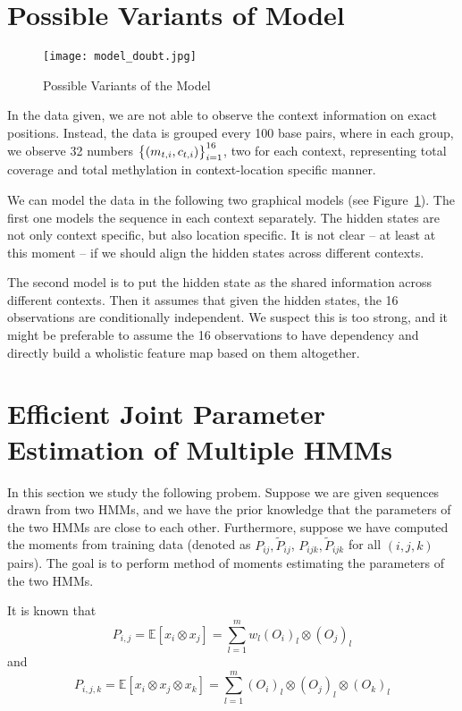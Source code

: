 \documentclass{article}
\def\E{\mathbb{E}}
\begin{document}
\section{Possible Variants of Model}

\begin{figure}
  \caption{Possible Variants of the Model}
  \centering
  \texttt{[image: model\_doubt.jpg]}
  \label{fig:modeldoubt}
\end{figure}

In the data given, we are not able to observe the context information on exact positions.
Instead, the data is grouped every 100 base pairs, where in each group, we observe
32 numbers $\cbr{(m_{t,i}, c_{t,i})}_{i=1}^{16}$, two for each context, representing
total coverage and total methylation in context-location specific manner.

We can model the data in the following two graphical models (see Figure~\ref{fig:modeldoubt}). The first one models
the sequence in each context separately. The hidden states are not only context specific,
but also location specific. It is not clear -- at least at this moment -- if we should
align the hidden states across different contexts.

The second model is to put the hidden state as the shared information across different
contexts. Then it assumes that given the hidden states, the 16 observations are conditionally
independent. We suspect this is too strong, and it might be preferable to assume the
16 observations to have dependency and directly build a wholistic feature map based
on them altogether.

\section{Efficient Joint Parameter Estimation of Multiple HMMs}
In this section we study the following probem.
Suppose we are given sequences drawn from two HMMs, and we have the prior knowledge that
the parameters of the two HMMs are close to each other.
Furthermore, suppose we have computed the moments from training data
(denoted as $P_{ij}, \tilde P_{ij}$, $P_{ijk}, \tilde P_{ijk}$ for all $(i,j,k)$ pairs).
The goal is to perform method of moments estimating the parameters of the two HMMs.

It is known that
\[ P_{i,j} = \E[x_i \otimes x_j] = \sum_{l=1}^m w_l (O_i)_l \otimes (O_j)_l \]
and
\[ P_{i,j,k} = \E[x_i \otimes x_j \otimes x_k] = \sum_{l=1}^m (O_i)_l \otimes (O_j)_l \otimes (O_k)_l \]
\end{document}

